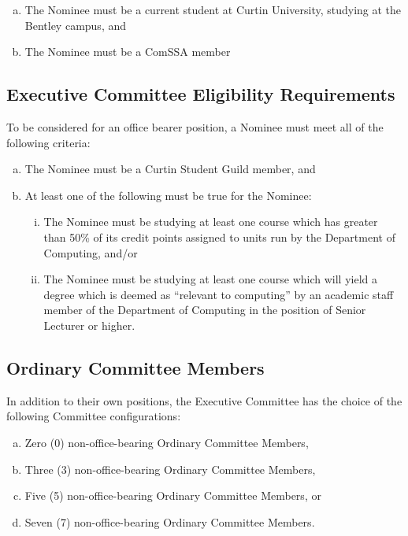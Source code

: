 \documentclass[a4paper,12pt]{article}
\begin{document}
\begin{enumerate}[a)]
	\item The Nominee must be a current student at Curtin University, studying at the Bentley campus, and
	\item The Nominee must be a ComSSA member
\end{enumerate}

\subsection{Executive Committee Eligibility Requirements}
\label{exec_committee_eligibility}

To be considered for an office bearer position, a Nominee must meet all of the following criteria:

\begin{enumerate}[a)]
	\item The Nominee must be a Curtin Student Guild member, and
	\item At least one of the following must be true for the Nominee:
	\begin{enumerate}[i)]
		\item The Nominee must be studying at least one course which has greater than 50\% of its credit points assigned to units run by the Department of Computing, and/or
		\item The Nominee must be studying at least one course which will yield a degree which is deemed as ``relevant to computing'' by an academic staff member of the Department of Computing in the position of Senior Lecturer or higher.
	\end{enumerate}
\end{enumerate}

\subsection{Ordinary Committee Members}

In addition to their own positions, the Executive Committee has the choice of the following Committee configurations:

\begin{enumerate}[a)]
	\item Zero (0) non-office-bearing Ordinary Committee Members,
	\item Three (3) non-office-bearing Ordinary Committee Members,
	\item Five (5) non-office-bearing Ordinary Committee Members, or
	\item Seven (7) non-office-bearing Ordinary Committee Members.
\end{enumerate}
\end{document}

